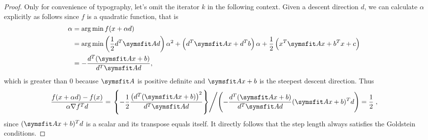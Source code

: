 \documentclass{assignment}[2019/09/15]
\begin{document}
\begin{proof}
        Only for convenience of typography, let's omit the iterator $k$ in the following context. Given a descent direction $d$, we can calculate $\alpha$ explicitly as follows since $f$ is a quadratic function, that is
        \begin{equation}
            \begin{aligned}
                \alpha
                &=\arg\min f(x+\alpha d)\\
                &=\arg\min \left(\frac{1}{2}d^T\matr{A}d\right)\alpha^2+\left(d^T\matr{A}x+d^Tb\right)\alpha+\frac{1}{2}\left(x^T\matr{A}x+b^Tx+c\right)\\
                &= -\frac{d^T(\matr{A}x+b)}{d^T\matr{A}d},
            \end{aligned}
        \end{equation}
        which is greater than 0 because $\matr{A}$ is positive definite and $\matr{A}x+b$ is the steepest descent direction. Thus
        \begin{equation}
            \frac{f(x+\alpha d)-f(x)}{\alpha\nabla f^Td}=\left.\left\{-\frac{1}{2}\frac{\left(d^T(\matr{A}x+b)\right)^2}{d^T\matr{A}d}\right\}\middle/\left(-\frac{d^T(\matr{A}x+b)}{d^T\matr{A}d}(\matr{A}x+b)^Td\right)=\frac{1}{2}\right.,
        \end{equation}
        since $(\matr{A}x+b)^Td$ is a scalar and its transpose equals itself. It directly follows that the step length always satisfies the Goldstein conditions.
    \end{proof}
\end{document}
